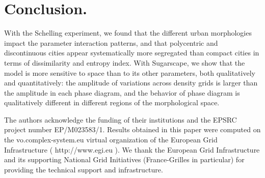 \documentclass[Afour,sageh,times]{sagej}
\begin{document}
%
%
%
%
%
%



\section{Conclusion.}

With the Schelling experiment, we found that the different urban morphologies impact the parameter interaction patterns, and that polycentric and discontinuous cities appear systematically more segregated than compact cities in terms of dissimilarity and entropy index. With Sugarscape, we show that the model is more sensitive to space than to its other parameters, both qualitatively and quantitatively: the amplitude of variations across density grids is larger than the amplitude in each phase diagram, and the behavior of phase diagram is qualitatively different in different regions of the morphological space.

\begin{acks}
The authors acknowledge the funding of their institutions and the EPSRC project number EP/M023583/1. Results obtained in this paper were computed on the vo.complex-system.eu virtual organization of the European Grid Infrastructure ( http://www.egi.eu ). We thank the European Grid Infrastructure and its supporting National Grid Initiatives (France-Grilles in particular) for providing the technical support and infrastructure.
\end{acks}








\end{document}
